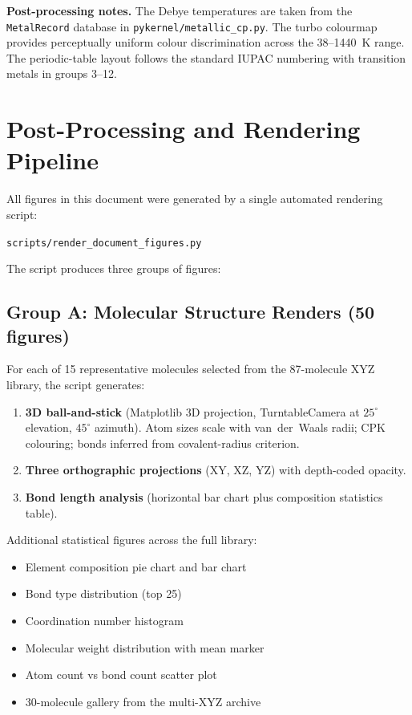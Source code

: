 \documentclass[11pt,a4paper]{article}
\begin{document}
\noindent\textbf{Post-processing notes.}  The Debye temperatures are
taken from the \texttt{MetalRecord} database in
\texttt{pykernel/metallic\_cp.py}.  The turbo colourmap provides
perceptually uniform colour discrimination across the 38--1440~K range.
The periodic-table layout follows the standard IUPAC numbering with
transition metals in groups 3--12.

\section{Post-Processing and Rendering Pipeline}
\label{sec:postprocessing}

All figures in this document were generated by a single automated
rendering script:

\begin{center}
  \texttt{scripts/render\_document\_figures.py}
\end{center}

The script produces three groups of figures:

\subsection{Group A: Molecular Structure Renders (50 figures)}

For each of 15 representative molecules selected from the
87-molecule XYZ library, the script generates:

\begin{enumerate}
  \item \textbf{3D ball-and-stick} (Matplotlib 3D projection,
        TurntableCamera at $25^\circ$ elevation, $45^\circ$ azimuth).
        Atom sizes scale with van~der~Waals radii; CPK colouring;
        bonds inferred from covalent-radius criterion.
  \item \textbf{Three orthographic projections} (XY, XZ, YZ) with
        depth-coded opacity.
  \item \textbf{Bond length analysis} (horizontal bar chart plus
        composition statistics table).
\end{enumerate}

Additional statistical figures across the full library:

\begin{itemize}
  \item Element composition pie chart and bar chart
  \item Bond type distribution (top 25)
  \item Coordination number histogram
  \item Molecular weight distribution with mean marker
  \item Atom count vs bond count scatter plot
  \item 30-molecule gallery from the multi-XYZ archive
\end{itemize}
\end{document}
